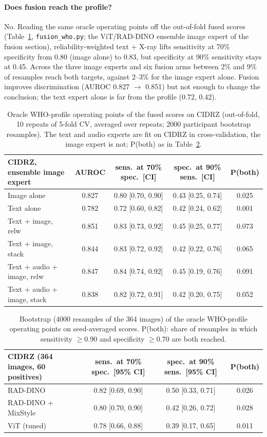 \documentclass[10pt,a4paper]{article}
\begin{document}
\paragraph{Does fusion reach the profile?} No. Reading the same oracle operating points off the out-of-fold fused scores (Table~\ref{tab:fusewho}, \texttt{fusion\_who.py}; the ViT/RAD-DINO ensemble image expert of the fusion section), reliability-weighted text + X-ray lifts sensitivity at 70\% specificity from 0.80 (image alone) to 0.83, but specificity at 90\% sensitivity stays at 0.45. Across the three image experts and six fusion arms between 2\% and 9\% of resamples reach both targets, against 2--3\% for the image expert alone. Fusion improves discrimination (AUROC 0.827 $\rightarrow$ 0.851) but not enough to change the conclusion; the text expert alone is far from the profile (0.72, 0.42).
\begin{table}[H]\centering\small\setlength{\tabcolsep}{4pt}
\begin{tabular}{lcccc}\toprule
CIDRZ, ensemble image expert & AUROC & sens.\ at 70\% spec.\ [CI] & spec.\ at 90\% sens.\ [CI] & P(both)\\\midrule
Image alone & 0.827 & 0.80 [0.70, 0.90] & 0.43 [0.25, 0.74] & 0.025\\
Text alone & 0.782 & 0.72 [0.60, 0.82] & 0.42 [0.24, 0.62] & 0.001\\
Text + image, relw & 0.851 & 0.83 [0.73, 0.92] & 0.45 [0.25, 0.77] & 0.073\\
Text + image, stack & 0.844 & 0.83 [0.72, 0.92] & 0.42 [0.22, 0.76] & 0.065\\
Text + audio + image, relw & 0.847 & 0.84 [0.74, 0.92] & 0.45 [0.19, 0.76] & 0.091\\
Text + audio + image, stack & 0.838 & 0.82 [0.72, 0.91] & 0.42 [0.20, 0.75] & 0.052\\\bottomrule
\end{tabular}\caption{Oracle WHO-profile operating points of the fused scores on CIDRZ (out-of-fold, 10 repeats of 5-fold CV, averaged over repeats; 2000 participant bootstrap resamples). The text and audio experts are fit on CIDRZ in cross-validation, the image expert is not; P(both) as in Table~\ref{tab:ceilboot}.}\label{tab:fusewho}\end{table}
\begin{table}[H]\centering\small
\begin{tabular}{lccc}\toprule
CIDRZ (364 images, 60 positives) & sens.\ at 70\% spec.\ [95\% CI] & spec.\ at 90\% sens.\ [95\% CI] & P(both)\\\midrule
RAD-DINO & 0.82 [0.69, 0.90] & 0.50 [0.33, 0.71] & 0.026\\
RAD-DINO + MixStyle & 0.80 [0.70, 0.90] & 0.42 [0.26, 0.72] & 0.028\\
ViT (tuned) & 0.78 [0.66, 0.88] & 0.39 [0.17, 0.65] & 0.011\\\bottomrule
\end{tabular}\caption{Bootstrap (4000 resamples of the 364 images) of the oracle WHO-profile operating points on seed-averaged scores. P(both): share of resamples in which sensitivity $\ge$0.90 and specificity $\ge$0.70 are both reached.}\label{tab:ceilboot}\end{table}
\end{document}
